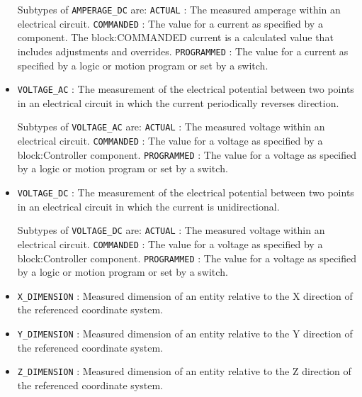 \begin{itemize}
Subtypes of \texttt{AMPERAGE_DC} are: 
\newline\tab \texttt{ACTUAL} : The measured amperage within an electrical circuit. 
\newline\tab \texttt{COMMANDED} : The value for a current as specified by a component. 
The {block:COMMANDED} current is a calculated value that includes adjustments and overrides. 
\newline\tab \texttt{PROGRAMMED} : The value for a current as specified by a logic or motion program or set by a switch. 
\item \texttt{VOLTAGE_AC} : The measurement of the electrical potential between two points in an electrical circuit in which the current periodically reverses direction. 

Subtypes of \texttt{VOLTAGE_AC} are: 
\newline\tab \texttt{ACTUAL} : The measured voltage within an electrical circuit. 
\newline\tab \texttt{COMMANDED} : The value for a voltage as specified by a {block:Controller} component. 
\newline\tab \texttt{PROGRAMMED} : The value for a voltage as specified by a logic or motion program or set by a switch. 
\item \texttt{VOLTAGE_DC} : The measurement of the electrical potential between two points in an electrical circuit in which the current is unidirectional. 

Subtypes of \texttt{VOLTAGE_DC} are: 
\newline\tab \texttt{ACTUAL} : The measured voltage within an electrical circuit. 
\newline\tab \texttt{COMMANDED} : The value for a voltage as specified by a {block:Controller} component. 
\newline\tab \texttt{PROGRAMMED} : The value for a voltage as specified by a logic or motion program or set by a switch. 
\item \texttt{X_DIMENSION} : Measured dimension of an entity relative to the X direction of the referenced coordinate system.
 

\item \texttt{Y_DIMENSION} : Measured dimension of an entity relative to the Y direction of the referenced coordinate system. 

\item \texttt{Z_DIMENSION} : Measured dimension of an entity relative to the Z direction of the referenced coordinate system. 


\end{itemize}
